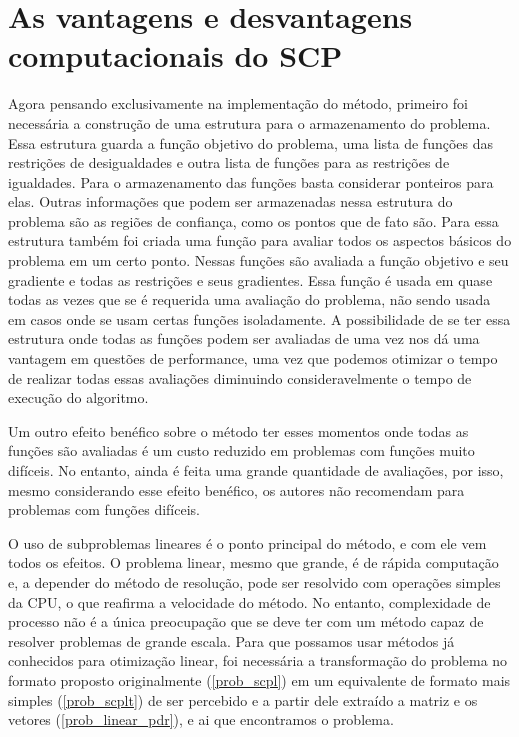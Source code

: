 \section{As vantagens e desvantagens computacionais do SCP}

\noindent
Agora pensando exclusivamente na implementação do método, primeiro foi necessária
a construção de uma estrutura para o armazenamento do problema. Essa estrutura guarda
a função objetivo do problema, uma lista de funções das restrições de desigualdades e
outra lista de funções para as restrições de igualdades. Para o armazenamento das
funções basta considerar ponteiros para elas. Outras informações que podem ser
armazenadas nessa estrutura do problema são as regiões de confiança, como os
pontos que de fato são. Para essa estrutura também foi criada uma função
para avaliar todos os aspectos básicos do problema em um certo ponto. Nessas
funções são avaliada a função objetivo e seu gradiente e todas as restrições e seus
gradientes. Essa função é usada em quase todas as vezes que se é requerida uma avaliação
do problema, não sendo usada em casos onde se usam certas funções isoladamente. A
possibilidade de se ter essa estrutura onde todas as funções podem ser avaliadas de uma vez
nos dá uma vantagem em questões de performance, uma vez que podemos otimizar o tempo de
realizar todas essas avaliações diminuindo consideravelmente o tempo de execução do algoritmo.

Um outro efeito benéfico sobre o método ter esses momentos onde todas as funções são
avaliadas é um custo reduzido em problemas com funções muito difíceis. No entanto, ainda
é feita uma grande quantidade de avaliações, por isso, mesmo considerando esse efeito
benéfico, os autores não recomendam para problemas com funções difíceis.

O uso de subproblemas lineares é o ponto principal do método, e com ele vem todos
os efeitos. O problema linear, mesmo que grande, é de rápida computação e, a depender
do método de resolução, pode ser resolvido com operações simples da CPU, o que reafirma
a velocidade do método. No entanto, complexidade de processo não é a única preocupação
que se deve ter com um método capaz de resolver problemas de grande escala. Para que
possamos usar métodos já conhecidos para otimização linear, foi necessária a transformação
do problema no formato proposto originalmente (\ref{prob_scpl}) em um equivalente de formato mais
simples (\ref{prob_scplt}) de ser percebido e a partir dele extraído a matriz
e os vetores (\ref{prob_linear_pdr}), e ai que encontramos o problema.

